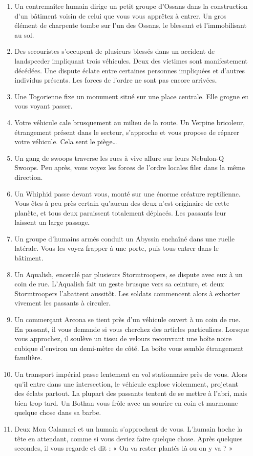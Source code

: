 \documentclass{article}
\begin{document}
\begin{enumerate}
	\item Un contremaître humain dirige un petit groupe d’Ossans dans la construction d’un bâtiment voisin de celui que vous vous apprêtez à entrer. Un gros élément de charpente tombe sur l’un des Ossans, le blessant et l’immobilisant au sol.
	\item Des secouristes s’occupent de plusieurs blessés dans un accident de landspeeder impliquant trois véhicules. Deux des victimes sont manifestement décédées. Une dispute éclate entre certaines personnes impliquées et d’autres individus présents. Les forces de l’ordre ne sont pas encore arrivées.
	\item Une Togorienne fixe un monument situé sur une place centrale. Elle grogne en vous voyant passer.
	\item Votre véhicule cale brusquement au milieu de la route. Un Verpine bricoleur, étrangement présent dans le secteur, s’approche et vous propose de réparer votre véhicule. Cela sent le piège…
	\item Un gang de swoops traverse les rues à vive allure sur leurs Nebulon-Q Swoops. Peu après, vous voyez les forces de l’ordre locales filer dans la même direction.
	\item Un Whiphid passe devant vous, monté sur une énorme créature reptilienne. Vous êtes à peu près certain qu’aucun des deux n’est originaire de cette planète, et tous deux paraissent totalement déplacés. Les passants leur laissent un large passage.
	\item Un groupe d’humains armés conduit un Abyssin enchaîné dans une ruelle latérale. Vous les voyez frapper à une porte, puis tous entrer dans le bâtiment.
	\item Un Aqualish, encerclé par plusieurs Stormtroopers, se dispute avec eux à un coin de rue. L’Aqualish fait un geste brusque vers sa ceinture, et deux Stormtroopers l’abattent aussitôt. Les soldats commencent alors à exhorter vivement les passants à circuler.
	\item Un commerçant Arcona se tient près d’un véhicule ouvert à un coin de rue. En passant, il vous demande si vous cherchez des articles particuliers. Lorsque vous approchez, il soulève un tissu de velours recouvrant une boîte noire cubique d’environ un demi-mètre de côté. La boîte vous semble étrangement familière.
	\item Un transport impérial passe lentement en vol stationnaire près de vous. Alors qu’il entre dans une intersection, le véhicule explose violemment, projetant des éclats partout. La plupart des passants tentent de se mettre à l’abri, mais bien trop tard. Un Bothan vous frôle avec un sourire en coin et marmonne quelque chose dans sa barbe.
	\item Deux Mon Calamari et un humain s’approchent de vous. L’humain hoche la tête en attendant, comme si vous deviez faire quelque chose. Après quelques secondes, il vous regarde et dit : « On va rester plantés là ou on y va ? »
\end{enumerate}
\end{document}
